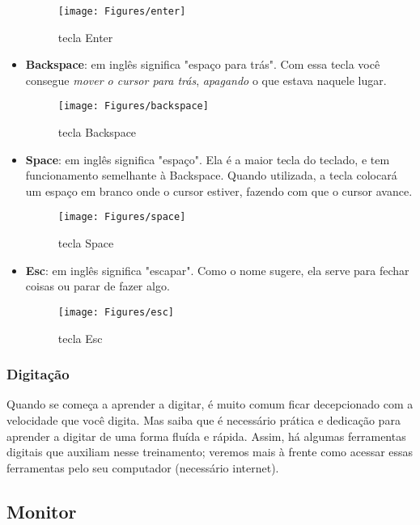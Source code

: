 \documentclass[hidelinks,12pt]{article}
\begin{document}
\begin{itemize}
{	\begin{figure}[!h]
	    \centering
		\texttt{[image: Figures/enter]}
		\label{fig:enter}
		\caption{tecla Enter}
	\end{figure}
	}

	\item { \textbf{Backspace}: em inglês significa "espaço para trás". Com essa tecla você consegue \emph{mover o cursor para trás}, \emph{apagando} o que estava naquele lugar.
	
    \begin{figure}[!h]
	    \centering
		\texttt{[image: Figures/backspace]}
		\label{fig:backspace}
		\caption{tecla Backspace}
	\end{figure}
	}

	\item { \textbf{Space}: em inglês significa "espaço". Ela é a maior tecla do teclado, e tem funcionamento semelhante à Backspace. Quando utilizada, a tecla colocará um espaço em branco onde o cursor estiver, fazendo com que o cursor avance.
    
    \begin{figure}[!h]
	    \centering
		\texttt{[image: Figures/space]}
		\label{fig:space}
		\caption{tecla Space}
	\end{figure}
	}

	\item { \textbf{Esc}: em inglês significa "escapar". Como o nome sugere, ela serve para fechar coisas ou parar de fazer algo.
	
	\begin{figure}[!h]
	    \centering
		\texttt{[image: Figures/esc]}
		\label{fig:esc}
		\caption{tecla Esc}
	\end{figure}
	}

\end{itemize}


\subsubsection{Digitação}

Quando se começa a aprender a digitar, é muito comum ficar decepcionado com a velocidade que você digita. Mas saiba que é necessário  prática e dedicação para aprender a digitar de uma forma fluída e rápida. Assim, há algumas ferramentas digitais que auxiliam nesse treinamento; veremos mais à frente como acessar essas ferramentas pelo seu computador (necessário internet).

\subsection{Monitor}
\end{document}
